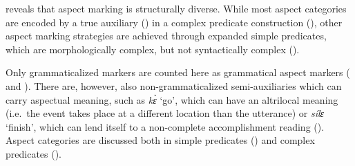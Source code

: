 \begin{table}
\caption{Distribution of aspect markers across morphological and syntactic constructions}
\label{Tab:Aspect}
\end{table}

 reveals that aspect marking is structurally diverse. While most aspect categories are encoded by a true auxiliary () in a complex predicate construction (), other aspect marking strategies are achieved through expanded simple predicates, which are morphologically complex, but not syntactically complex ().

Only grammaticalized markers are counted here as grammatical aspect markers ( and ). There are, however,  also non-grammaticalized semi-aux\-il\-ia\-ries which can carry aspectual meaning, such as {\itshape kɛ̀} `go', which can have an altrilocal meaning (i.e.\ the event takes place at a different location than the utterance) or {\itshape sílɛ} `finish', which can lend itself to a non-complete accomplishment reading ().
Aspect categories are discussed both in simple predicates () and complex predicates (). 







